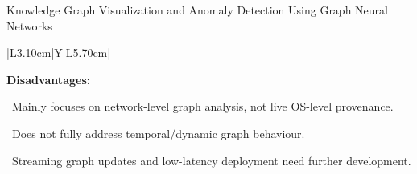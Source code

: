 \documentclass[aspectratio=169,10pt]{beamer}
\begin{document}
\begin{frame}[t]{Knowledge Graph Visualization and Anomaly Detection Using Graph Neural Networks}
{\begin{tabularx}{\textwidth}{|L{3.10cm}|Y|L{5.70cm}|}
\begin{minipage}[t]{\linewidth}
\textcolor{limitRed}{\textbf{Disadvantages:}}\par\vspace{1.3pt}
\textbullet~Mainly focuses on network-level graph analysis, not live OS-level provenance.\par\vspace{1.8pt}\textbullet~Does not fully address temporal/dynamic graph behaviour.\par\vspace{1.8pt}\textbullet~Streaming graph updates and low-latency deployment need further development.\par\vspace{3pt}
\end{minipage} \\\hline
\end{tabularx}}
\end{frame}
\end{document}
